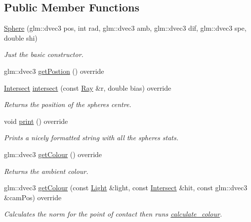 \subsection*{Public Member Functions}
\begin{DoxyCompactItemize}
\item 
\mbox{\hyperlink{class_sphere_a79293e081c0e5559bc764a524a3c985f}{Sphere}} (glm\+::dvec3 pos, int rad, glm\+::dvec3 amb, glm\+::dvec3 dif, glm\+::dvec3 spe, double shi)
\begin{DoxyCompactList}\small\item\em Just the basic constructor. \end{DoxyCompactList}\item 
glm\+::dvec3 \mbox{\hyperlink{class_sphere_abcc01a6057eb30df9605ce3786b6c47c}{get\+Postion}} () override
\item 
\mbox{\hyperlink{struct_intersect}{Intersect}} \mbox{\hyperlink{class_sphere_a3ba8c2a4bc8108b244f35e71c14b952d}{intersect}} (const \mbox{\hyperlink{struct_ray}{Ray}} \&r, double bias) override
\begin{DoxyCompactList}\small\item\em Returns the position of the sphere\textquotesingle{}s centre. \end{DoxyCompactList}\item 
void \mbox{\hyperlink{class_sphere_a95537121c5308b7b250f4a53171303ef}{print}} () override
\begin{DoxyCompactList}\small\item\em Prints a nicely formatted string with all the sphere\textquotesingle{}s stats. \end{DoxyCompactList}\item 
glm\+::dvec3 \mbox{\hyperlink{class_sphere_a700025702852f2f6c888c7dbd720ea76}{get\+Colour}} () override
\begin{DoxyCompactList}\small\item\em Returns the ambient colour. \end{DoxyCompactList}\item 
glm\+::dvec3 \mbox{\hyperlink{class_sphere_ac5c6bbcd43b8caabe4a23ba3e53d414a}{get\+Colour}} (const \mbox{\hyperlink{class_light}{Light}} \&light, const \mbox{\hyperlink{struct_intersect}{Intersect}} \&hit, const glm\+::dvec3 \&cam\+Pos) override
\begin{DoxyCompactList}\small\item\em Calculates the norm for the point of contact then runs \mbox{\hyperlink{util_8h_add552e26ff1418c78cbcb09b18ab0f44}{calculate\+\_\+colour}}. \end{DoxyCompactList}\end{DoxyCompactItemize}


